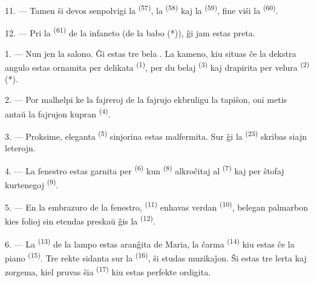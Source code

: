 

11. --- Tamen ŝi devos senpolvigi la 
\textsuperscript{(57)}, la  \textsuperscript{(58)} kaj la
 \textsuperscript{(59)}, fine viŝi la 
\textsuperscript{(60)}.

12. --- Pri la  \textsuperscript{(61)} de la infaneto (de la
babo (*)), ĝi jam estas preta.

\VUsaut{5.0mm}
\VUsaut{3.0mm}

1. --- Nun jen la salono. Ĝi estas tre bela . La kameno, kiu
situas ĉe la dekstra angulo estas ornamita per delikata 
\textsuperscript{(1)}, per du belaj  \textsuperscript{(3)} kaj
drapirita per velura  \textsuperscript{(2)} (*).

2. --- Por malhelpi ke la fajreroj de la fajrujo ekbruligu la tapiŝon, oni
metis antaŭ la fajrujon kupran  \textsuperscript{(4)}.

3. --- Proksime, eleganta  \textsuperscript{(5)} sinjorina
estas malfermita. Sur ĝi la  \textsuperscript{(23)}
skribas siajn leterojn.

4. --- La fenestro estas garnita per 
\textsuperscript{(6)} kun  \textsuperscript{(8)} alkroĉitaj al
 \textsuperscript{(7)} kaj per ŝtofaj kurtenegoj  \textsuperscript{(9)}.

5. --- En la embrazuro de la fenestro,  \textsuperscript{(11)}
enhavas verdan  \textsuperscript{(10)}, belegan palmarbon kies
folioj sin etendas preskaŭ ĝis la  \textsuperscript{(12)}.

6. --- La  \textsuperscript{(13)} de la lampo estas aranĝita
de Maria, la ĉarma  \textsuperscript{(14)} kiu estas ĉe la
piano \textsuperscript{(15)}. Tre rekte sidanta sur la 
\textsuperscript{(16)}, ŝi studas muzikaĵon. Ŝi estas tre lerta kaj zorgema,
kiel pruvas ŝia  \textsuperscript{(17)} kiu estas perfekte
ordigita.

